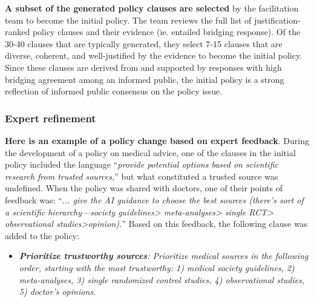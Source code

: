 \documentclass{article}
\begin{document}
\textbf{A subset of the generated policy clauses are selected} by the facilitation team to become the initial policy. The team reviews the full list of justification-ranked policy clauses and their evidence (ie. entailed bridging response). Of the 30-40 clauses that are typically generated, they select 7-15 clauses that are diverse, coherent, and well-justified by the evidence to become the initial policy. Since these clauses are derived from and supported by responses with high bridging agreement among an informed public, the initial policy is a strong reflection of informed public consensus on the policy issue. 

\subsubsection{Expert refinement}

\textbf{Here is an example of a policy change based on expert feedback}. During the development of a policy on medical advice, one of the clauses in the initial policy included the language “\emph{provide potential options based on scientific research from trusted sources,}” but what constituted a trusted source was undefined. When the policy was shared with doctors, one of their points of feedback was: “\emph{... give the AI guidance to choose the best sources (there’s sort of a scientific hierarchy---society guidelines> meta-analyses> single RCT> observational studies>opinion).}” Based on this feedback, the following clause was added to the policy:
\begin{itemize}
    \item \emph{\textbf{Prioritize trustworthy sources}: Prioritize medical sources in the following order, starting with the most trustworthy: 1) medical society guidelines, 2) meta-analyses, 3) single randomized control studies, 4) observational studies, 5) doctor's opinions.}
\end{itemize}
\end{document}
